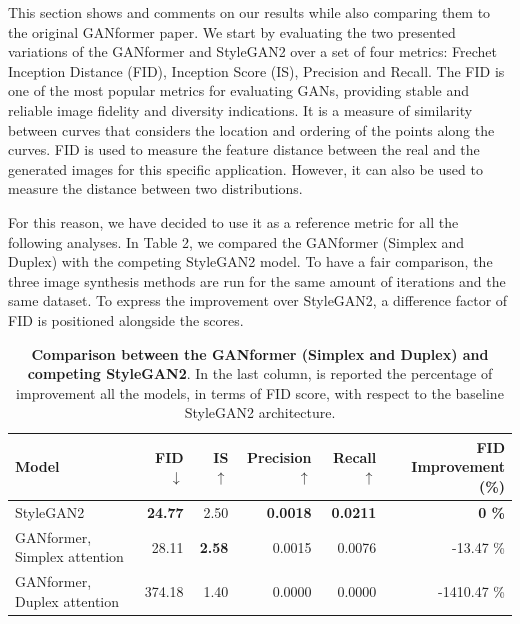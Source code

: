 \documentclass{article}
\begin{document}
	This section shows and comments on our results while also comparing them to the original 
	GANformer 
	paper. We start by evaluating the two presented variations of the GANformer and StyleGAN2 over a 
	set 
	of four metrics: Frechet Inception Distance (FID), Inception Score (IS), Precision and Recall. The FID 
	is one of the most popular metrics for evaluating GANs, providing stable and reliable image fidelity 
	and 
	diversity indications. It is a measure of similarity between curves that considers the location and 
	ordering 
	of the points along the curves. FID is used to measure the feature distance between the real and the 
	generated 
	images for this specific application. However, it can also be used to measure the distance between 
	two distributions.
	
	For this reason, we have decided to use it as a reference metric for all the following analyses. In 
	Table 2, we compared the GANformer (Simplex and Duplex) with the competing StyleGAN2 model. 
	To have a fair comparison, the three image synthesis methods are run for the same amount of 
	iterations and the same dataset. To express the improvement over StyleGAN2, a difference factor of 
	FID is positioned alongside the scores. 
	\begin{table}[htb]
		\centering
		\caption{\textbf{Comparison between the GANformer (Simplex and Duplex) and competing 
				StyleGAN2}. In the last column, is reported the percentage of improvement all the models, in 
			terms 
			of FID score, with respect to the baseline StyleGAN2 architecture.}
		\label{tab:our-results}
		\vspace{3mm}
		\small
		\begin{tabular}{l|rrrrr}
			\toprule
			\textbf{Model}  & \textbf{FID $\downarrow$}  & \textbf{IS $\uparrow$} & 
			\textbf{Precision$\uparrow$}  & \textbf{Recall $\uparrow$} & \textbf{FID Improvement (\%)}\\ 
			\midrule
			StyleGAN2                    &  \textbf{24.77} & 2.50 & \textbf{0.0018} & \textbf{0.0211} & \textbf{0 
			\%} \\ 
			GANformer, Simplex attention & 28.11 & \textbf{2.58} & 0.0015 & 0.0076 & -13.47 \%\\ 
			GANformer, Duplex attention  & 374.18 & 1.40 & 0.0000 & 0.0000 & -1410.47 \% \\ 
			\bottomrule
		\end{tabular}
	\end{table}
	
\end{document}
